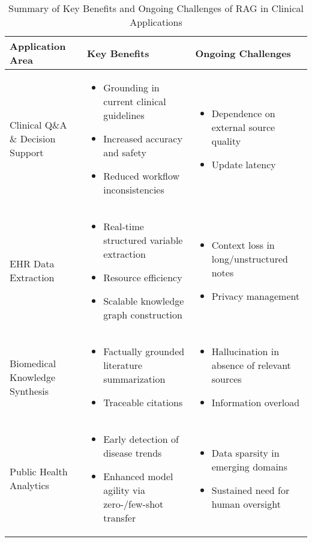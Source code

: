 \documentclass[11pt]{article}
\begin{document}
\begin{table}[t]
\centering
\caption{Summary of Key Benefits and Ongoing Challenges of RAG in Clinical Applications}
\label{tab:clinical_rag_summary}
\begin{tabular}{|p{}|p{}|p{}|}
\hline
\textbf{Application Area} & \textbf{Key Benefits} & \textbf{Ongoing Challenges} \\
\hline
Clinical Q\&A \& Decision Support & 
\begin{itemize}
  \item Grounding in current clinical guidelines
  \item Increased accuracy and safety
  \item Reduced workflow inconsistencies
\end{itemize}
& 
\begin{itemize}
  \item Dependence on external source quality
  \item Update latency
\end{itemize}
\\
\hline
EHR Data Extraction & 
\begin{itemize}
  \item Real-time structured variable extraction
  \item Resource efficiency
  \item Scalable knowledge graph construction
\end{itemize}
& 
\begin{itemize}
  \item Context loss in long/unstructured notes
  \item Privacy management
\end{itemize}
\\
\hline
Biomedical Knowledge Synthesis & 
\begin{itemize}
  \item Factually grounded literature summarization
  \item Traceable citations
\end{itemize}
& 
\begin{itemize}
  \item Hallucination in absence of relevant sources
  \item Information overload
\end{itemize}
\\
\hline
Public Health Analytics & 
\begin{itemize}
  \item Early detection of disease trends
  \item Enhanced model agility via zero-/few-shot transfer
\end{itemize}
& 
\begin{itemize}
  \item Data sparsity in emerging domains
  \item Sustained need for human oversight
\end{itemize}
\\
\hline
\end{tabular}
\end{table}
\end{document}
